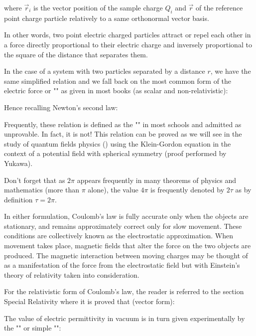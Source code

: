 	where $\vec{r}_i$ is the vector position of the sample charge $Q_i$ and $\vec{r}$ of the reference point charge particle relatively to a same orthonormal vector basis.
	
	In other words, two point electric charged particles attract or repel each other in a force directly proportional to their electric charge and inversely proportional to the square of the distance that separates them.
	
	In the case of a system with two particles separated by a distance $r$, we have the same simplified relation and we fall back on the most common form of the electric force or "" as given in most books (as scalar and non-relativistic):
	
	Hence recalling Newton's second law:
	
	Frequently, these relation is defined as the "" in most schools and admitted as unprovable. In fact, it is not! This relation can be proved as we will see in the study of quantum fields physics () using the Klein-Gordon equation in the context of a potential field with spherical symmetry (proof performed by Yukawa).
	
	\begin{tcolorbox}[title=Remark,colframe=black,arc=10pt]
	Don't forget that as $2\pi$ appears frequently in many theorems of physics and mathematics (more than $\pi$ alone), the value $4\pi$ is frequently denoted by $2\tau$ as by definition $\tau=2\pi$.
	\end{tcolorbox}
	In either formulation, Coulomb's law is fully accurate only when the objects are stationary, and remains approximately correct only for slow movement. These conditions are collectively known as the electrostatic approximation. When movement takes place, magnetic fields that alter the force on the two objects are produced. The magnetic interaction between moving charges may be thought of as a manifestation of the force from the electrostatic field but with Einstein's theory of relativity taken into consideration.
	\begin{tcolorbox}[title=Remark,colframe=black,arc=10pt]
	For the relativistic form of Coulomb's law, the reader is referred to the section Special Relativity where it is proved that (vector form):
	
	\end{tcolorbox}
	The value of electric permittivity in vacuum is in turn given experimentally by the "" or simple "":
	
